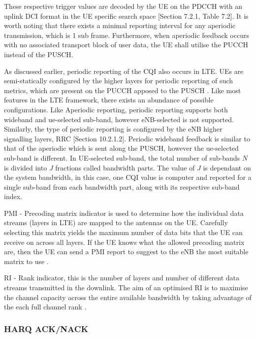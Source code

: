 \documentclass{article}
\begin{document}
These respective trigger values are decoded by the UE on the PDCCH with an uplink DCI format in the UE specific search space \cite{ETSITS136213}[Section 7.2.1, Table 7.2].
It is worth noting that there exists a minimal reporting interval for any aperiodic transmission, which is 1 sub frame. Furthermore, when aperiodic feedback occurs with no associated transport block of user data, the UE shall utilise the PUCCH instead of the PUSCH.


As discussed earlier, periodic reporting of the CQI also occurs in LTE. UEs are semi-statically configured by the higher layers for periodic reporting of such metrics, which are present on the PUCCH apposed to the PUSCH \cite[Section 7.2.2]{ETSITS136213}. Like most features in the LTE framework, there exists an abundance of possible configurations. Like Aperiodic reporting, periodic reporting supports both wideband and ue-selected sub-band, however eNB-selected is not supported. Similarly, the type of periodic reporting is configured by the eNB higher signalling layers, RRC \cite{umts_sesia}[Section 10.2.1.2]. Periodic wideband feedback is similar to that of the aperiodic which is sent along the PUSCH, however the ue-selected sub-band is different. In UE-selected sub-band, the total number of sub-bands $N$ is divided into $J$ fractions called bandwidth parts. The value of $J$ is dependant on the system bandwidth, in this case, one CQI value is computer and reported for a single sub-band from each bandwidth part, along with its respective sub-band index.

PMI - Precoding matrix indicator is used to determine how the individual data streams (layers in LTE) are mapped to the antennas on the UE. Carefully selecting this matrix yields the maximum number of data bits that the UE can receive on across all layers. If the UE knows what the allowed precoding matrix are, then the UE can send a PMI report to suggest to the eNB the most suitable matrix to use \cite{csi_defs}.

RI - Rank indicator,  this is the number of layers and number of different data streams transmitted in the downlink. The aim of an optimised RI is to maximise the channel capacity across the entire available bandwidth by taking advantage of the each full channel rank  \cite{csi_defs}. 

\subsubsection{HARQ ACK/NACK}
\end{document}
